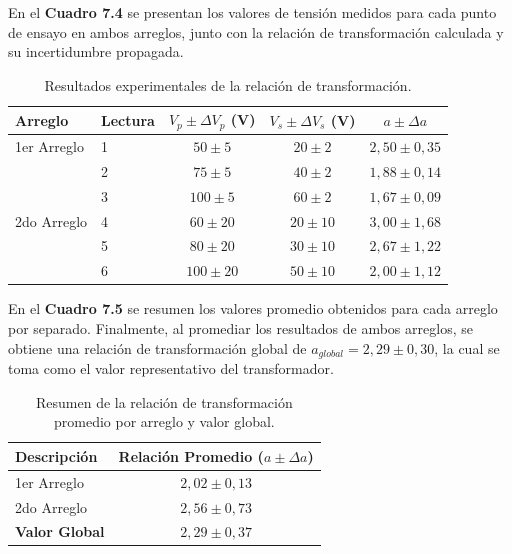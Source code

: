 En el \textbf{Cuadro 7.4} se presentan los valores de tensión medidos para cada punto de ensayo en ambos arreglos, junto con la relación de transformación calculada y su incertidumbre propagada. 


\begin{table}[H]
\centering
\caption{Resultados experimentales de la relación de transformación.}
\renewcommand{\arraystretch}{1.3}
\begin{tabular}{llccc}
\toprule
\textbf{Arreglo} & \textbf{Lectura} & \textbf{$V_p \pm \Delta V_p$ (V)} & \textbf{$V_s \pm \Delta V_s$ (V)} & \textbf{$a \pm \Delta a$} \\ 
\midrule
1er Arreglo & 1 & $50 \pm 5$ & $20 \pm 2$ & $2,50 \pm 0,35$ \\
            & 2 & $75 \pm 5$ & $40 \pm 2$ & $1,88 \pm 0,14$ \\
            & 3 & $100 \pm 5$ & $60 \pm 2$ & $1,67 \pm 0,09$ \\
\midrule
2do Arreglo & 4 & $60 \pm 20$ & $20 \pm 10$ & $3,00 \pm 1,68$ \\
            & 5 & $80 \pm 20$ & $30 \pm 10$ & $2,67 \pm 1,22$ \\
            & 6 & $100 \pm 20$ & $50 \pm 10$ & $2,00 \pm 1,12$ \\
\bottomrule
\end{tabular}
\end{table}

En el \textbf{Cuadro 7.5} se resumen los valores promedio obtenidos para cada arreglo por separado. Finalmente, al promediar los resultados de ambos arreglos, se obtiene una relación de transformación global de $a_{global} = 2,29 \pm 0,30$, la cual se toma como el valor representativo del transformador.


\begin{table}[H]
\centering
\caption{Resumen de la relación de transformación promedio por arreglo y valor global.}
\renewcommand{\arraystretch}{1.3}
\begin{tabular}{lc}
\toprule
\textbf{Descripción} & \textbf{Relación Promedio ($a \pm \Delta a$)} \\ 
\midrule
1er Arreglo & $2,02 \pm 0,13$ \\
2do Arreglo & $2,56 \pm 0,73$ \\
\midrule
\textbf{Valor Global} & \textbf{$2,29 \pm 0,37$} \\
\bottomrule
\end{tabular}
\end{table}



